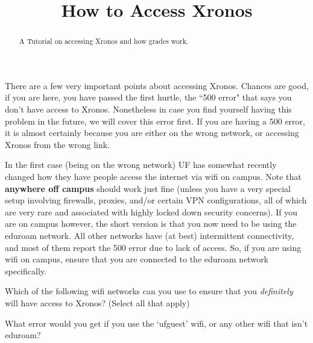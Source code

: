 \documentclass{ximera}
\title{How to Access Xronos}
\begin{document}
\begin{abstract}
A Tutorial on accessing Xronos and how grades work.
\end{abstract}
\maketitle

There are a few very important points about accessing Xronos. Chances are good, if you are here, you have passed the first hurtle, the ``500 error" that says you don't have access to Xronos. Nonetheless in case you find yourself having this problem in the future, we will cover this error first. If you are having a 500 error, it is almost certainly because you are either on the wrong network, or accessing Xronos from the wrong link. 

In the first case (being on the wrong network) UF has somewhat recently changed how they have people access the internet via wifi on campus. Note that \textbf{anywhere off campus} should work just fine (unless you have a very special setup involving firewalls, proxies, and/or certain VPN configurations, all of which are very rare and associated with highly locked down security concerns). If you are on campus however, the short version is that you now need to be using the eduroam network. All other networks have (at best) intermittent connectivity, and most of them report the 500 error due to lack of access. So, if you are using wifi on campus, ensure that you are connected to the eduroam network specifically.

\begin{problem}
    Which of the following wifi networks can you use to ensure that you \textit{definitely} will have access to Xronos? (Select all that apply)
    \begin{selectAll}
    \end{selectAll}
    \begin{problem}
        What error would you get if you use the `ufguest' wifi, or any other wifi that isn't eduroam?
        \begin{multipleChoice}
        \end{multipleChoice}
    \end{problem}
\end{problem}
\end{document}
